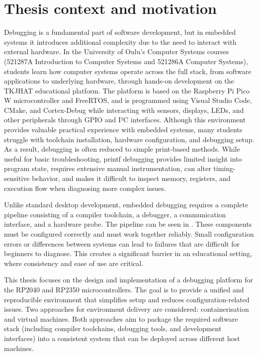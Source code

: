 \section{Thesis context and motivation}


Debugging is a fundamental part of software development, but in embedded systems it introduces additional complexity due to the need to interact with external hardware. In the University of Oulu's Computer Systems courses (521287A Introduction to Computer Systems and 521286A Computer Systems), students learn how computer systems operate across the full stack, from software applications to underlying hardware, through hands-on development on the TKJHAT educational platform. The platform is based on the Raspberry Pi Pico W microcontroller and FreeRTOS, and is programmed using Visual Studio Code, CMake, and Cortex-Debug while interacting with sensors, displays, LEDs, and other peripherals through GPIO and I²C interfaces. Although this environment provides valuable practical experience with embedded systems, many students struggle with toolchain installation, hardware configuration, and debugging setup. As a result, debugging is often reduced to simple print-based methods. While useful for basic troubleshooting, printf debugging provides limited insight into program state, requires extensive manual instrumentation, can alter timing-sensitive behavior, and makes it difficult to inspect memory, registers, and execution flow when diagnosing more complex issues.

Unlike standard desktop development, embedded debugging requires a complete pipeline consisting of a compiler toolchain, a debugger, a communication interface, and a hardware probe. The pipeline can be seen in . These components must be configured correctly and must work together reliably. Small configuration errors or differences between systems can lead to failures that are difficult for beginners to diagnose. This creates a significant barrier in an educational setting, where consistency and ease of use are critical.

This thesis focuses on the design and implementation of a debugging platform for the RP2040 and RP2350 microcontrollers. The goal is to provide a unified and reproducible environment that simplifies setup and reduces configuration-related issues. Two approaches for environment delivery are considered: containerisation and virtual machines. Both approaches aim to package the required software stack (including compiler toolchains, debugging tools, and development interfaces) into a consistent system that can be deployed across different host machines.

